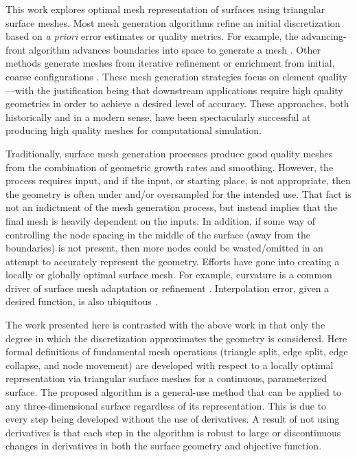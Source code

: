 This work explores optimal mesh representation of surfaces using 
triangular surface meshes.
Most mesh generation algorithms refine an initial discretization based
on {\it a priori} error estimates or quality metrics. For example, the
advancing-front algorithm advances boundaries into space to generate a
mesh \cite{tristrano98,diaz-morcillo98}. Other methods generate
meshes from iterative refinement or enrichment from initial, coarse
configurations \cite{marcum98,marcum00,shewchuk02}. These mesh
generation strategies focus on element quality---with the
justification being that downstream applications require high quality
geometries in order to achieve a desired level of accuracy. These
approaches, both historically and in a modern sense, have been 
spectacularly successful at producing high quality meshes for 
computational simulation.

Traditionally, surface mesh generation processes produce good quality
meshes from the combination of geometric growth rates and smoothing.
However, the process requires input, and if the input, or starting place,
is not appropriate, then the geometry is often under and/or oversampled
for the intended use. That fact is not an indictment of the mesh
generation process, but instead implies that the final mesh is heavily
dependent on the inputs. In addition, if some way of controlling the
node spacing in the middle of the surface (away from the boundaries) is
not present, then more nodes could be wasted/omitted in an attempt to
accurately represent the geometry. Efforts have gone into
creating a locally or globally optimal surface mesh. For example,
curvature is a common driver of surface mesh adaptation or refinement
\cite{siqueria13}. Interpolation error, given a desired function, 
is also ubiquitous \cite{peraire87,alauzet06,buscaglia97,huang05}.

The work presented here is contrasted with the above work in that only
the degree in which the discretization approximates the geometry is
considered.  Here formal definitions of fundamental mesh operations
(triangle split, edge split, edge collapse, and node movement) are
developed with respect to a locally optimal representation via
triangular surface meshes for a continuous, parameterized surface. The
proposed algorithm is a general-use method that can be applied to any
three-dimensional surface regardless of its representation.  This is due
to every step being developed without the use of derivatives. A result
of not using derivatives is that each step in the algorithm is robust to
large or discontinuous changes in derivatives in both the surface
geometry and objective function.


